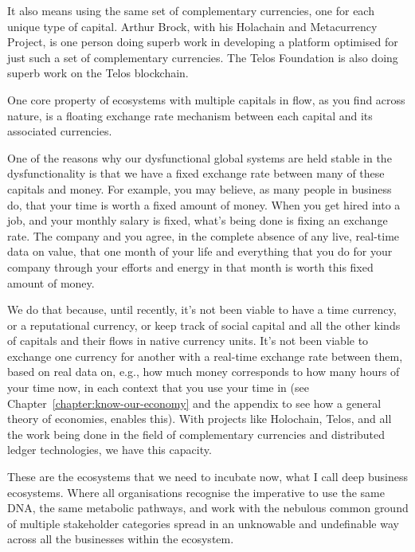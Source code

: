 It also means using the same set of complementary currencies,  one for each unique type of capital. Arthur Brock,  with his Holachain and Metacurrency Project, is one person doing superb work in developing a platform optimised for just such a set of complementary currencies. The Telos Foundation  is also doing superb work on the Telos blockchain.


One core property of ecosystems with multiple capitals  in flow, as you find across nature, is a floating exchange rate mechanism between each capital and its associated currencies. 


One of the reasons why our dysfunctional global systems are held stable in the dysfunctionality is that we have a fixed exchange rate between many of these capitals and money. For example, you may believe, as many people in business do, that your time is worth a fixed amount of money. When you get hired into a job, and your monthly salary is fixed, what's being done is fixing an exchange rate.  The company and you agree, in the complete absence of any live, real-time data on value, that one month of your life and everything that you do for your company through your efforts and energy in that month is worth this fixed amount of money.


We do that because, until recently, it's not been viable to have a time currency, or a reputational currency, or keep track of social capital and all the other kinds of capitals and their flows in native currency units. It’s not been viable to exchange one currency for another with a real-time exchange rate between them, based on real data on, e.g., how much money corresponds to how many hours of your time now, in each context that you use your time in (see Chapter~\ref{chapter:know-our-economy} and the appendix to see how a general theory of economies,  enables this). With projects like Holochain, Telos, and all the work being done in the field of complementary currencies and distributed ledger technologies, we have this capacity.


These are the ecosystems that we need to incubate now, what I call deep business ecosystems. Where all organisations recognise the imperative to use the same DNA, the same metabolic pathways, and work with the nebulous common ground of multiple stakeholder categories spread in an unknowable and undefinable way across all the businesses within the ecosystem.


